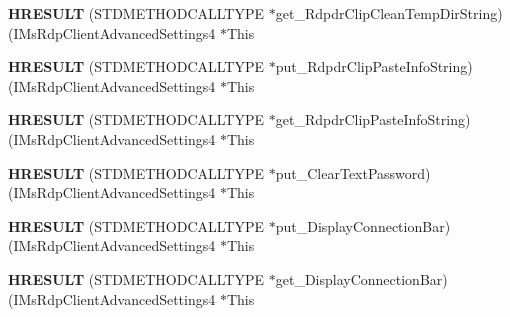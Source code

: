\begin{DoxyCompactItemize}
\item 
\mbox{\label{struct_i_ms_rdp_client_advanced_settings4_vtbl_a16509a04a76a40bdfaaa4c379be49e47}} 
{\bfseries H\+R\+E\+S\+U\+LT} (S\+T\+D\+M\+E\+T\+H\+O\+D\+C\+A\+L\+L\+T\+Y\+PE $\ast$get\+\_\+\+Rdpdr\+Clip\+Clean\+Temp\+Dir\+String)(I\+Ms\+Rdp\+Client\+Advanced\+Settings4 $\ast$This
\item 
\mbox{\label{struct_i_ms_rdp_client_advanced_settings4_vtbl_a3957eeaedae5dbe0d6e47c2dea0d2505}} 
{\bfseries H\+R\+E\+S\+U\+LT} (S\+T\+D\+M\+E\+T\+H\+O\+D\+C\+A\+L\+L\+T\+Y\+PE $\ast$put\+\_\+\+Rdpdr\+Clip\+Paste\+Info\+String)(I\+Ms\+Rdp\+Client\+Advanced\+Settings4 $\ast$This
\item 
\mbox{\label{struct_i_ms_rdp_client_advanced_settings4_vtbl_a2dd40fc515ac5fa15dbd18c38eaf37f9}} 
{\bfseries H\+R\+E\+S\+U\+LT} (S\+T\+D\+M\+E\+T\+H\+O\+D\+C\+A\+L\+L\+T\+Y\+PE $\ast$get\+\_\+\+Rdpdr\+Clip\+Paste\+Info\+String)(I\+Ms\+Rdp\+Client\+Advanced\+Settings4 $\ast$This
\item 
\mbox{\label{struct_i_ms_rdp_client_advanced_settings4_vtbl_a5a074f910d9b0f919589f71190b49709}} 
{\bfseries H\+R\+E\+S\+U\+LT} (S\+T\+D\+M\+E\+T\+H\+O\+D\+C\+A\+L\+L\+T\+Y\+PE $\ast$put\+\_\+\+Clear\+Text\+Password)(I\+Ms\+Rdp\+Client\+Advanced\+Settings4 $\ast$This
\item 
\mbox{\label{struct_i_ms_rdp_client_advanced_settings4_vtbl_ac4128cd2debf988fbe5527dda81b527f}} 
{\bfseries H\+R\+E\+S\+U\+LT} (S\+T\+D\+M\+E\+T\+H\+O\+D\+C\+A\+L\+L\+T\+Y\+PE $\ast$put\+\_\+\+Display\+Connection\+Bar)(I\+Ms\+Rdp\+Client\+Advanced\+Settings4 $\ast$This
\item 
\mbox{\label{struct_i_ms_rdp_client_advanced_settings4_vtbl_aeaa5b3230c42a0941f12aa4e36205482}} 
{\bfseries H\+R\+E\+S\+U\+LT} (S\+T\+D\+M\+E\+T\+H\+O\+D\+C\+A\+L\+L\+T\+Y\+PE $\ast$get\+\_\+\+Display\+Connection\+Bar)(I\+Ms\+Rdp\+Client\+Advanced\+Settings4 $\ast$This
\item 
\mbox{\label{struct_i_ms_rdp_client_advanced_settings4_vtbl_a5fef0638bddee34d4df1ca14dbd55df6}} 

\end{DoxyCompactItemize}
